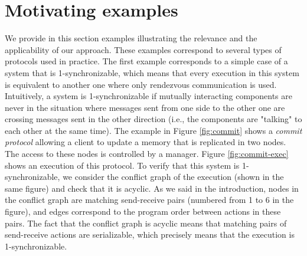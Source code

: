\section{Motivating examples}

%
%
%
%
%
%

We provide in this section examples illustrating the relevance and the applicability of our approach. These examples correspond to several types of protocols used in practice. The first example corresponds to a simple case of a system that is 1-synchronizable, which means that every execution in this system is equivalent to another one where only rendezvous communication is used. Intuitively, a system is 1-synchronizable if mutually interacting components are never in the situation where messages sent from one side to the other one are crossing messages sent in the other direction (i.e., the components are "talking" to each other at the same time). The example in Figure \ref{fig:commit} shows a {\em commit protocol} allowing a client to update a memory that is replicated in two nodes. The access to these nodes is controlled by a manager. Figure \ref{fig:commit-exec} shows an execution of this protocol. To verify that this system is 1-synchronizable, we consider the conflict graph of the execution (shown in the same figure) and check that it is acyclic. As we said in the introduction, nodes in the conflict graph are matching send-receive pairs (numbered from 1 to 6 in the figure), and edges correspond to the program order between actions in these pairs. The fact that the conflict graph is acyclic means that matching pairs of send-receive actions are serializable, which precisely means that the execution is 1-synchronizable. 


